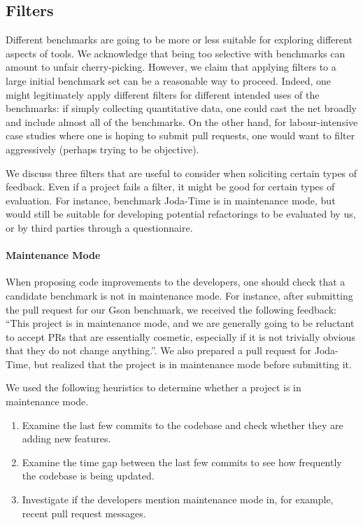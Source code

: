 \subsection{Filters}
Different benchmarks are going to be more or less suitable for exploring different aspects of tools. We acknowledge that being too selective with benchmarks can amount to unfair cherry-picking. However, we claim that applying filters to a large initial benchmark set can be a reasonable way to proceed. Indeed, one might legitimately apply different filters for different intended uses of the benchmarks: if simply collecting quantitative data, one could cast the net broadly and include almost all of the benchmarks. On the other hand, for labour-intensive case studies where one is hoping to submit pull requests, one would want to filter aggressively (perhaps trying to be objective).

We discuss three filters that are useful to consider when soliciting certain types of feedback. Even if a project fails a filter, it might be good for certain types of evaluation. For instance, benchmark Joda-Time is in maintenance mode, but would still be suitable for developing potential refactorings to be evaluated by us, or by third parties through a questionnaire.

\paragraph{Maintenance Mode}
When proposing code improvements to the developers, one should check that a candidate benchmark is not in maintenance mode. For instance, after submitting the pull request for our Gson benchmark, we received the following feedback: ``This project is in maintenance mode, and we are generally going to be reluctant to accept PRs that are essentially cosmetic, especially if it is not trivially obvious that they do not change anything.''. We also prepared a pull request for Joda-Time, but realized that the project is in maintenance mode before submitting it.

We used the following heuristics to determine whether a project is in maintenance mode.
\begin{enumerate}
  \item Examine the last few commits to the codebase and check whether they are adding new features.
  \item Examine the time gap between the last few commits to see how frequently the codebase is being updated.
  \item Investigate if the developers mention maintenance mode in, for example, recent pull request messages.
\end{enumerate}

